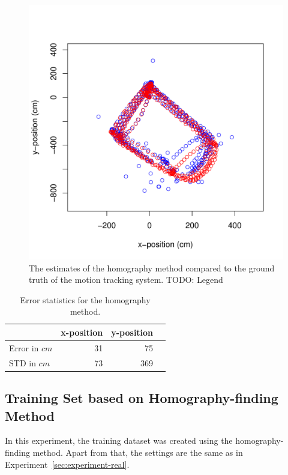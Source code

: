 \documentclass[11pt]{report}
\begin{document}
\begin{figure}[h!]
\begin{center}
\includegraphics[width=0.7\columnwidth]{SIFT_vs_OptiTrack}
\caption{{\label{fig:flightpath} The estimates of the homography
    method compared to the ground truth of the motion tracking system.
    TODO: Legend%
  }}
\end{center}
\end{figure}

\begin{table}[H]
  \centering
  \begin{tabular}{lrrr}
    \toprule
    & x-position & y-position\\
    \midrule
    Error in $cm$ & 31 & 75\\
    STD in $cm$ & 73 & 369\\
    \bottomrule
  \end{tabular}
  \caption[Error statistics homography method.]{Error statistics for the homography method.}
  \label{tab:homoerror}
\end{table}

\subsection{Training Set based on Homography-finding Method}
\label{sec:traininghomo}

In this experiment, the training dataset was created using the
homography-finding method. Apart from that, the settings are the same
as in Experiment~\ref{sec:experiment-real}.
\end{document}
